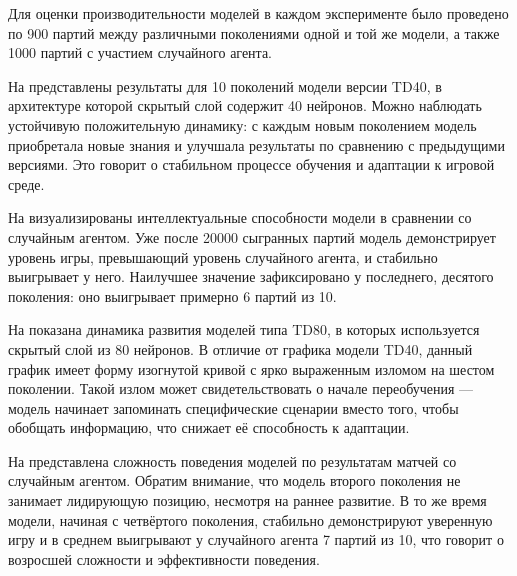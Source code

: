 Для оценки производительности моделей в каждом эксперименте было проведено по 900 партий между различными поколениями одной и той же модели, а также 1000 партий с участием случайного агента.

На  представлены результаты для 10 поколений модели версии TD40, в архитектуре которой скрытый слой содержит 40 нейронов. Можно наблюдать устойчивую положительную динамику: с каждым новым поколением модель приобретала новые знания и улучшала результаты по сравнению с предыдущими версиями. Это говорит о стабильном процессе обучения и адаптации к игровой среде.


На  визуализированы интеллектуальные способности модели в сравнении со случайным агентом. Уже после 20000 сыгранных партий модель демонстрирует уровень игры, превышающий уровень случайного агента, и стабильно выигрывает у него. Наилучшее значение зафиксировано у последнего, десятого поколения: оно выигрывает примерно 6 партий из 10.


На  показана динамика развития моделей типа TD80, в которых используется скрытый слой из 80 нейронов. В отличие от графика модели TD40, данный график имеет форму изогнутой кривой с ярко выраженным изломом на шестом поколении. Такой излом может свидетельствовать о начале переобучения --- модель начинает запоминать специфические сценарии вместо того, чтобы обобщать информацию, что снижает её способность к адаптации.


На  представлена сложность поведения моделей по результатам матчей со случайным агентом. Обратим внимание, что модель второго поколения не занимает лидирующую позицию, несмотря на раннее развитие. В то же время модели, начиная с четвёртого поколения, стабильно демонстрируют уверенную игру и в среднем выигрывают у случайного агента 7 партий из 10, что говорит о возросшей сложности и эффективности поведения.


